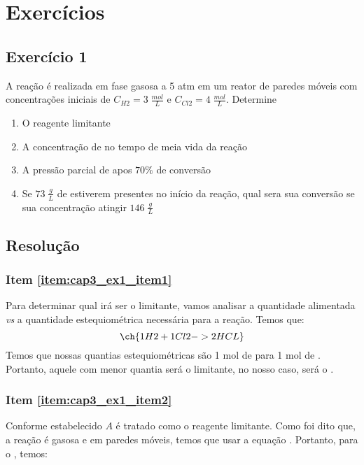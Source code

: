 \section{Exercícios}
\subsection{Exercício 1}
A reação  é realizada em fase gasosa a 5 atm em um reator de paredes móveis com
concentrações iniciais de \(C_{H2} = 3 \; \frac{mol}{L} \) e \(C_{Cl2} = 4 \; \frac{mol}{L} \).
Determine
\begin{enumerate}
    \item O reagente limitante \label{item:cap3_ex1_item1}
    \item A concentração de  no tempo de meia vida da reação \label{item:cap3_ex1_item2}
    \item A pressão parcial de  apos \(70 \%\) de conversão \label{item:cap3_ex1_item3}
    \item {Se \(73 \; \frac{g}{L}\) de  estiverem presentes no início da reação, qual sera
    sua conversão se sua concentração atingir \(146 \; \frac{g}{L}\) \label{item:cap3_ex1_item4}}
\end{enumerate}
\subsection{Resolução}
\subsubsection{Item \ref{item:cap3_ex1_item1}}
Para determinar qual irá ser o limitante, vamos analisar a quantidade alimentada \textit{vs} a
quantidade estequiométrica necessária para a reação. Temos que:
\begin{equation*}
    \ch{1H2 + 1 Cl2 -> 2HCL}
\end{equation*}
Temos que nossas quantias estequiométricas são 1 mol de  para 1 mol de . Portanto,
aquele com menor quantia será o limitante, no nosso caso, será o .

\subsubsection{Item \ref{item:cap3_ex1_item2}}

Conforme estabelecido \(A\) é tratado como o reagente limitante. Como foi dito que, a reação é
gasosa e em paredes móveis, temos que usar a equação .
Portanto, para o , temos:

